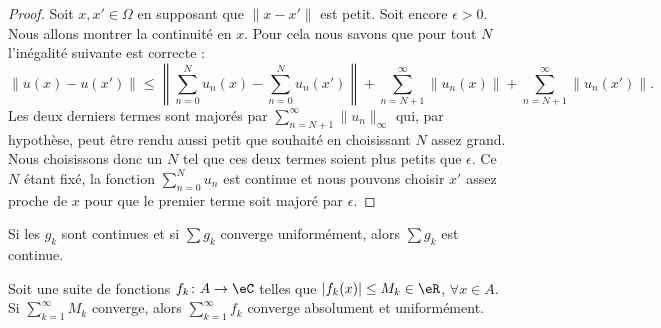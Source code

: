 \begin{proof}
    Soit \( x,x'\in \Omega\) en supposant que \( \| x-x' \|\) est petit. Soit encore \( \epsilon>0\). Nous allons montrer la continuité en \( x\). Pour cela nous savons que pour tout \( N\) l'inégalité suivante est correcte :
    \begin{equation}
        \| u(x)-u(x') \|\leq \left\|  \sum_{n=0}^Nu_n(x)-\sum_{n=0}^{N}u_n(x') \right\|+\sum_{n=N+1}^{\infty}\| u_n(x) \|+\sum_{n=N+1}^{\infty}\| u_n(x') \|.
    \end{equation}
    Les deux derniers termes sont majorés par \( \sum_{n=N+1}^{\infty}\| u_n \|_{\infty}\) qui, par hypothèse, peut être rendu aussi petit que souhaité en choisissant \( N\) assez grand. Nous choisissons donc un \( N\) tel que ces deux termes soient plus petits que \( \epsilon\). Ce \( N\) étant fixé, la fonction \( \sum_{n=0}^{N}u_n\) est continue et nous pouvons choisir \( x'\) assez proche de \( x\) pour que le premier terme soit majoré par \( \epsilon\).
\end{proof}

\begin{theorem}			\label{ThoSerUnifCont}
	Si les $g_k$ sont continues et si $\sum g_k$ converge uniformément, alors $\sum g_k$ est continue.
\end{theorem}

\begin{theorem}		\label{ThoCritWeierstrass}
	Soit une suite de fonctions $f_k\colon A\to \eC$ telles que $| f_k(x) |\leq M_k\in\eR$, $\forall x\in A$. Si $\sum_{k=1}^{\infty}M_k$ converge, alors $\sum_{k=1}^{\infty}f_k$ converge absolument et uniformément.
\end{theorem}

